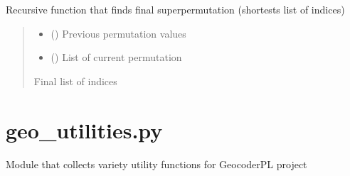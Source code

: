 \documentclass[letterpaper,10pt,english]{sphinxmanual}
\begin{document}
\begin{fulllineitems}
\begin{fulllineitems}
\label{\detokenize{super_permutations:super_permutations.SuperPerms.get_super_perm}}
\pysigstartsignatures
{}
\pysigstopsignatures
\sphinxAtStartPar
Recursive function that finds final superpermutation (shortests list of indices)
\begin{quote}\begin{description}
\begin{itemize}
\item {} 
\sphinxAtStartPar
{} (\sphinxcode{\sphinxupquote{Optional}}{[}\sphinxcode{\sphinxupquote{str}}{]}) \textendash{} Previous permutation values

\item {} 
\sphinxAtStartPar
{} (\sphinxcode{\sphinxupquote{Optional}}{[}\sphinxcode{\sphinxupquote{List}}{[}\sphinxcode{\sphinxupquote{str}}{]}{]}) \textendash{} List of current permutation

\end{itemize}

\sphinxAtStartPar
\sphinxcode{\sphinxupquote{List}}{[}\sphinxcode{\sphinxupquote{int}}{]}

\sphinxAtStartPar
Final list of indices

\end{description}\end{quote}

\end{fulllineitems}


\end{fulllineitems}


\sphinxstepscope


\chapter{geo\_utilities.py}
\label{\detokenize{geo_utilities:module-geo_utilities}}\label{\detokenize{geo_utilities:geo-utilities-py}}\label{\detokenize{geo_utilities::doc}}
\sphinxAtStartPar
Module that collects variety utility functions for GeocoderPL project
\end{document}
